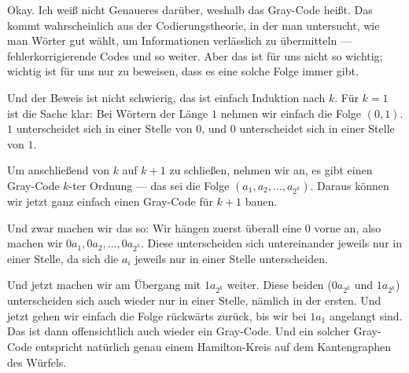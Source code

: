 \begin{spoken-clean}[00:46:03 - 00:48:21]
Okay. Ich weiß nicht Genaueres darüber, weshalb das Gray-Code heißt. Das kommt wahrscheinlich aus der Codierungstheorie, in der man untersucht, wie man Wörter gut wählt, um Informationen verlässlich zu übermitteln --- fehlerkorrigierende Codes und so weiter. Aber das ist für uns nicht so wichtig; wichtig ist für uns nur zu beweisen, dass es eine solche Folge immer gibt.

Und der Beweis ist nicht schwierig, das ist einfach Induktion nach $k$. Für $k = 1$ ist die Sache klar: Bei Wörtern der Länge $1$ nehmen wir einfach die Folge $(0, 1)$. $1$ unterscheidet sich in einer Stelle von $0$, und $0$ unterscheidet sich in einer Stelle von $1$.

Um anschließend von $k$ auf $k+1$ zu schließen, nehmen wir an, es gibt einen Gray-Code $k$-ter Ordnung --- das sei die Folge $(a_1, a_2, \dots, a_{2^k})$. Daraus können wir jetzt ganz einfach einen Gray-Code für $k+1$ bauen.

Und zwar machen wir das so: Wir hängen zuerst überall eine $0$ vorne an, also machen wir $0a_1, 0a_2, \dots, 0a_{2^k}$. Diese unterscheiden sich untereinander jeweils nur in einer Stelle, da sich die $a_i$ jeweils nur in einer Stelle unterscheiden.

Und jetzt machen wir am Übergang mit $1a_{2^k}$ weiter. Diese beiden ($0a_{2^k}$ und $1a_{2^k}$) unterscheiden sich auch wieder nur in einer Stelle, nämlich in der ersten. Und jetzt gehen wir einfach die Folge rückwärts zurück, bis wir bei $1a_1$ angelangt sind. Das ist dann offensichtlich auch wieder ein Gray-Code. Und ein solcher Gray-Code entspricht natürlich genau einem Hamilton-Kreis auf dem Kantengraphen des Würfels.
\end{spoken-clean}

